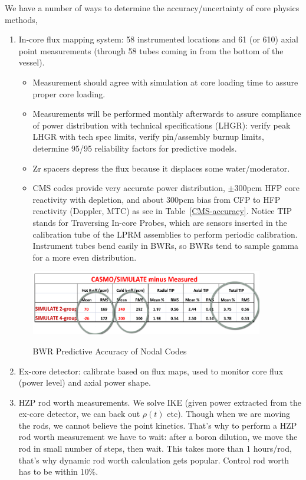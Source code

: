 \documentclass{school-22.211-notes}
\begin{document}
\clearpage
{}
We have a number of ways to determine the accuracy/uncertainty of core physics methods,
\begin{enumerate}
\item In-core flux mapping system: 58 instrumented locations and 61 (or 610) axial point measurements (through 58 tubes coming in from the bottom of the vessel). 
  \begin{itemize}
    \item Measurement should agree with simulation at core loading time to assure proper core loading. 
    \item Measurements will be performed monthly afterwards to assure compliance of power distribution with technical specifications (LHGR): verify peak LHGR with tech spec limits, verify pin/assembly burnup limits, determine 95/95 reliability factors for predictive models. 
    \item Zr spacers depress the flux because it displaces some water/moderator. 
    \item CMS codes provide very accurate power distribution, $\pm 300$pcm HFP core reactivity with depletion, and about 300pcm bias from CFP to HFP reactivity (Doppler, MTC) as see in Table~\ref{CMS-accuracy}. Notice TIP stands for Traversing In-core Probes, which are sensors inserted in the calibration tube of the LPRM assemblies to perform periodic calibration. Instrument tubes bend easily in BWRs, so BWRs tend to sample gamma for a more even distribution. 
      \begin{table}[ht]
        \centering
        \includegraphics[width=4in]{images/design/CMS-accuracy.png}
        \caption{BWR Predictive Accuracy of Nodal Codes} \label{CMS-accuracy}
      \end{table}
  \end{itemize}

\item Ex-core detector: calibrate based on flux maps, used to monitor core flux (power level) and axial power shape. 

\item HZP rod worth measurements. We solve IKE (given power extracted from the ex-core detector, we can back out $\rho (t)$ etc). Though when we are moving the rods, we cannot believe the point kinetics. That's why to perform a HZP rod worth measurement we have to wait: after a boron dilution, we move the rod in small number of steps, then wait. This takes more than 1 hours/rod, that's why dynamic rod worth calculation gets popular. Control rod worth has to be within 10\%.


\end{enumerate}
\end{document}
